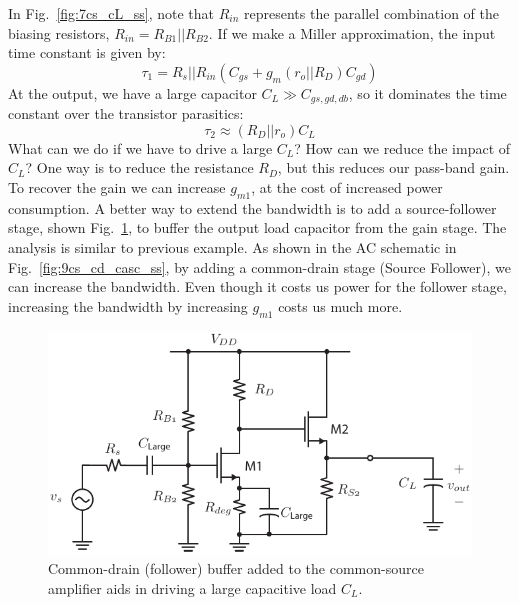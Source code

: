 In Fig.~\ref{fig:7cs_cL_ss}, note that $R_{in}$ represents the parallel combination of the biasing resistors, $R_{in} = R_{B1} || R_{B2}$.  If we make a Miller approximation, the input time constant is given by:
 \begin{equation}
	\tau_1 = R_s || R_{in} (C_{gs} + g_m (r_o||R_D) C_{gd} )
\end{equation}
At the output, we have a large capacitor $C_L \gg C_{gs,gd,db}$, so it dominates the time constant over the transistor parasitics:
 \begin{equation}
	\tau_2 \approx (R_D|| r_o) C_L 
\end{equation}
What can we do if we have to drive a large $C_L$?  How can we reduce the impact of $C_L$? One way is to reduce the resistance $R_D$, but this reduces our pass-band gain.   To recover the gain we can increase $g_{m1}$, at the cost of increased power consumption.   A better way to extend the bandwidth is to add a source-follower stage, shown Fig.~\ref{fig:8_cs_cd_casc_dc}, to buffer the output load capacitor from the gain stage.  The analysis is similar to previous example.  As shown in the AC schematic in Fig.~\ref{fig:9cs_cd_casc_ss}, by adding a common-drain stage (Source Follower), we can increase the bandwidth. Even though it costs us power for the follower stage, increasing the bandwidth by increasing $g_{m1}$ costs us much more.
\begin{figure}[tb]
\begin{center}
\includegraphics[scale=1]{8_cs_cd_casc_dc}
\end{center}
\caption{Common-drain (follower) buffer added to the common-source amplifier aids in driving a large capacitive load $C_L$.}
\label{fig:8_cs_cd_casc_dc}
\end{figure}

